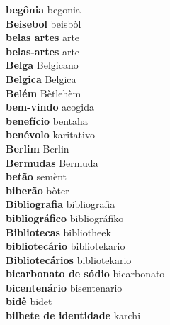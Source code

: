 \textbf{ begônia  } begonia \\
\textbf{ Beisebol  } beisbòl \\
\textbf{ belas artes  } arte \\
\textbf{ belas-artes  } arte \\
\textbf{ Belga  } Belgicano \\
\textbf{ Belgica  } Belgica \\
\textbf{ Belém  } Bètlehèm \\
\textbf{ bem-vindo  } acogida \\
\textbf{ benefício  } bentaha \\
\textbf{ benévolo  } karitativo \\
\textbf{ Berlim  } Berlin \\
\textbf{ Bermudas  } Bermuda \\
\textbf{ betão  } semènt \\
\textbf{ biberão  } bòter \\
\textbf{ Bibliografia  } bibliografia \\
\textbf{ bibliográfico  } bibliográfiko \\
\textbf{ Bibliotecas  } bibliotheek \\
\textbf{ bibliotecário  } bibliotekario \\
\textbf{ Bibliotecários  } bibliotekario \\
\textbf{ bicarbonato de sódio  } bicarbonato \\
\textbf{ bicentenário  } bisentenario \\
\textbf{ bidê  } bidet \\
\textbf{ bilhete de identidade  } karchi \\
